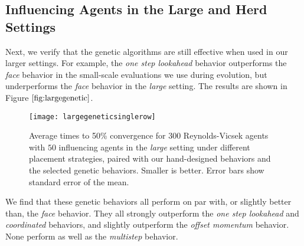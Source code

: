 \subsection{Influencing Agents in the Large and Herd Settings}
Next, we verify that the genetic algorithms are still effective when used in
our larger settings.
For example, the \textit{one step lookahead} behavior outperforms the
\textit{face} behavior in the small-scale evaluations we use during evolution,
but underperforms the \textit{face} behavior in the \textit{large} setting.
The results are shown in Figure $\ref{fig:largegenetic}$.

\begin{figure}
    \centering
    \texttt{[image: largegeneticsinglerow]}
    \caption{Average times to 50\% convergence for $300$ Reynolds-Vicsek agents
    with $50$ influencing agents in the \textit{large} setting under different
    placement strategies, paired with our hand-designed behaviors and the
    selected genetic behaviors.
    Smaller is better.
    Error bars show standard error of the mean.}
    \label{fig:largegenetic}
\end{figure}
We find that these genetic behaviors all perform on par with, or slightly
better than, the \textit{face} behavior.
They all strongly outperform the \textit{one step lookahead} and
\textit{coordinated} behaviors, and slightly outperform the
\textit{offset momentum} behavior.
None perform as well as the \textit{multistep} behavior.

%

